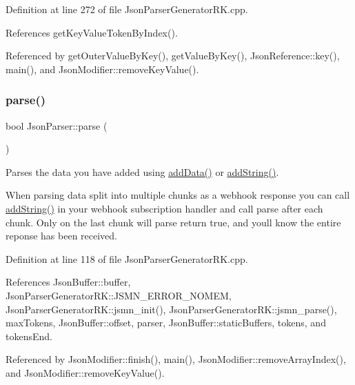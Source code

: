 Definition at line 272 of file Json\+Parser\+Generator\+R\+K.\+cpp.



References get\+Key\+Value\+Token\+By\+Index().



Referenced by get\+Outer\+Value\+By\+Key(), get\+Value\+By\+Key(), Json\+Reference\+::key(), main(), and Json\+Modifier\+::remove\+Key\+Value().

\mbox{\label{class_json_parser_ad528213e8600cbad4d85910b62fc033a}} 
\subsubsection{\texorpdfstring{parse()}{parse()}}
{\footnotesize\ttfamily bool Json\+Parser\+::parse (\begin{DoxyParamCaption}{ }\end{DoxyParamCaption})}



Parses the data you have added using \hyperlink{class_json_buffer_a760cb5be42ed2d2ca9306b1109e76af3}{add\+Data()} or \hyperlink{class_json_buffer_a61bf30ac6e1bd460f1e809d02a7d5ba4}{add\+String()}. 

When parsing data split into multiple chunks as a webhook response you can call \hyperlink{class_json_buffer_a61bf30ac6e1bd460f1e809d02a7d5ba4}{add\+String()} in your webhook subscription handler and call parse after each chunk. Only on the last chunk will parse return true, and you\textquotesingle{}ll know the entire reponse has been received. 

Definition at line 118 of file Json\+Parser\+Generator\+R\+K.\+cpp.



References Json\+Buffer\+::buffer, Json\+Parser\+Generator\+R\+K\+::\+J\+S\+M\+N\+\_\+\+E\+R\+R\+O\+R\+\_\+\+N\+O\+M\+EM, Json\+Parser\+Generator\+R\+K\+::jsmn\+\_\+init(), Json\+Parser\+Generator\+R\+K\+::jsmn\+\_\+parse(), max\+Tokens, Json\+Buffer\+::offset, parser, Json\+Buffer\+::static\+Buffers, tokens, and tokens\+End.



Referenced by Json\+Modifier\+::finish(), main(), Json\+Modifier\+::remove\+Array\+Index(), and Json\+Modifier\+::remove\+Key\+Value().

\mbox{\label{class_json_parser_a182ab93b3639f0a99f37f9101eb48361}} 
